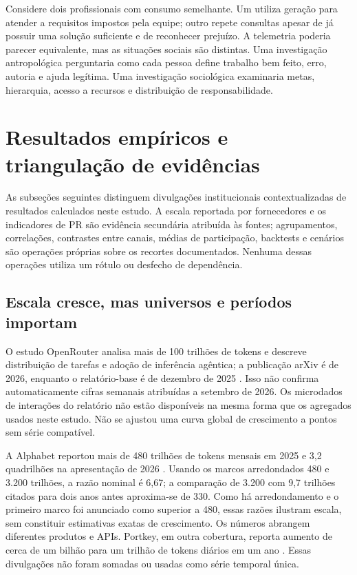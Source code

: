 \documentclass[11pt,a4paper]{article}
\begin{document}
Considere dois profissionais com consumo semelhante. Um utiliza geração para atender a requisitos impostos pela equipe; outro repete consultas apesar de já possuir uma solução suficiente e de reconhecer prejuízo. A telemetria poderia parecer equivalente, mas as situações sociais são distintas. Uma investigação antropológica perguntaria como cada pessoa define trabalho bem feito, erro, autoria e ajuda legítima. Uma investigação sociológica examinaria metas, hierarquia, acesso a recursos e distribuição de responsabilidade.

\section{Resultados empíricos e triangulação de evidências}
As subseções seguintes distinguem divulgações institucionais contextualizadas de resultados calculados neste estudo. A escala reportada por fornecedores e os indicadores de PR são evidência secundária atribuída às fontes; agrupamentos, correlações, contrastes entre canais, médias de participação, backtests e cenários são operações próprias sobre os recortes documentados. Nenhuma dessas operações utiliza um rótulo ou desfecho de dependência.
\subsection{Escala cresce, mas universos e períodos importam}
O estudo OpenRouter analisa mais de 100 trilhões de tokens e descreve distribuição de tarefas e adoção de inferência agêntica; a publicação arXiv é de 2026, enquanto o relatório-base é de dezembro de 2025 \cite{openrouter2026}. Isso não confirma automaticamente cifras semanais atribuídas a setembro de 2026. Os microdados de interações do relatório não estão disponíveis na mesma forma que os agregados usados neste estudo. Não se ajustou uma curva global de crescimento a pontos sem série compatível.

A Alphabet reportou mais de 480 trilhões de tokens mensais em 2025 e 3,2 quadrilhões na apresentação de 2026 \cite{google2025,google2026}. Usando os marcos arredondados 480 e 3.200 trilhões, a razão nominal é 6,67; a comparação de 3.200 com 9,7 trilhões citados para dois anos antes aproxima-se de 330. Como há arredondamento e o primeiro marco foi anunciado como superior a 480, essas razões ilustram escala, sem constituir estimativas exatas de crescimento. Os números abrangem diferentes produtos e APIs. Portkey, em outra cobertura, reporta aumento de cerca de um bilhão para um trilhão de tokens diários em um ano \cite{portkey2026}. Essas divulgações não foram somadas ou usadas como série temporal única.
\end{document}
